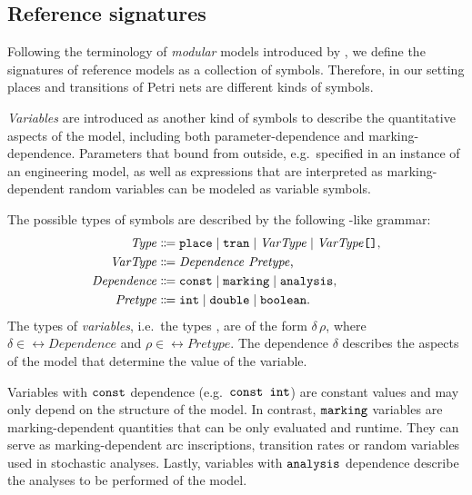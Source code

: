 \subsection{Reference  signatures}

Following the terminology of \emph{modular } models introduced by \citet{Kindler01modular}, we define the signatures of reference  models as a collection of symbols. Therefore, in our setting places and transitions of Petri nets are different kinds of symbols.

\emph{Variables} are introduced as another kind of symbols to describe the quantitative aspects of the model, including both parameter-dependence and marking-dependence. Parameters that bound from outside, e.g.\ specified in an instance of an engineering model, as well as expressions that are interpreted as marking-dependent random variables can be modeled as variable symbols.

The possible types of symbols are described by the following -like grammar:
\begin{equation}
  \begin{aligned}
    \ebnfVar{Type} &\ebnfEq \lit{place} \mid \lit{tran} \mid \ebnfVar{VarType} \mid \bagtype{\ebnfVar{VarType}} \text, \\
    \ebnfVar{VarType} &\ebnfEq \ebnfVar{Dependence}\ \ebnfVar{Pretype} \text,\\
    \rel{Dependence} &\ebnfEq \lit{const} \mid \lit{marking} \mid \lit{analysis}\text, \\
    \ebnfVar{Pretype} &\ebnfEq \lit{int} \mid \lit{double} \mid \lit{boolean} \text.
  \end{aligned}
\end{equation}
The types of \emph{variables}, i.e.~the types , are of the form \(\delta\, \rho\), where \(\delta \in \rel{Dependence}\) and \(\rho \in \rel{Pretype}\). The dependence \(\delta\) describes the aspects of the model that determine the value of the variable.

Variables with \(\texttt{\upshape const}\) dependence (e.g.~\(\texttt{\upshape const int}\)) are constant values and may only depend on the structure of the model. In contrast, \(\texttt{\upshape marking}\) variables are marking-dependent quantities that can be only evaluated and runtime. They can serve as marking-dependent arc inscriptions, transition rates or random variables used in stochastic analyses. Lastly, variables with \(\texttt{\upshape analysis}\) dependence describe the analyses to be performed of the model.

